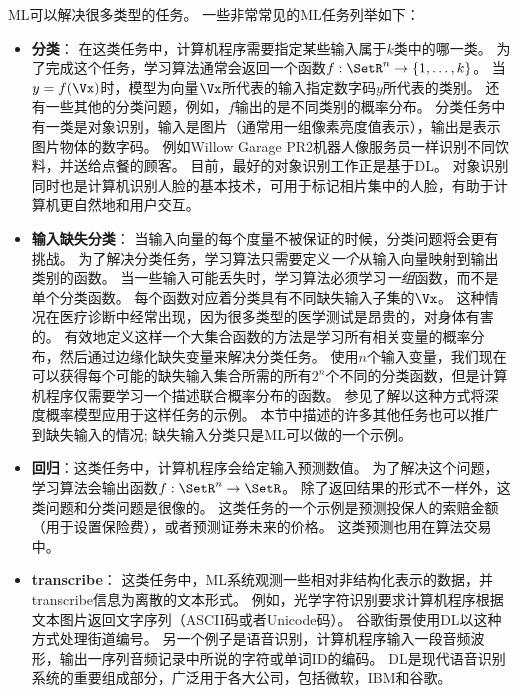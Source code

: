 \gls{ML}可以解决很多类型的任务。
一些非常常见的\gls{ML}任务列举如下：
\begin{itemize}
    \item \textbf{分类}：
    在这类任务中，计算机程序需要指定某些输入属于$k$类中的哪一类。
    为了完成这个任务，学习算法通常会返回一个函数$f:\SetR^n \to \{1,\dots,k\}$。
    当$y=f(\Vx)$时，模型为向量$\Vx$所代表的输入指定数字码$y$所代表的类别。
    还有一些其他的分类问题，例如，$f$输出的是不同类别的概率分布。
    分类任务中有一类是对象识别，输入是图片（通常用一组像素亮度值表示），输出是表示图片物体的数字码。
    例如Willow Garage PR2机器人像服务员一样识别不同饮料，并送给点餐的顾客\citep{Goodfellow2010}。
    目前，最好的对象识别工作正是基于\gls{DL}\citep{Krizhevsky-2012-small,Ioffe+Szegedy-2015}。
    对象识别同时也是计算机识别人脸的基本技术，可用于标记相片集中的人脸\citep{Taigman-et-al-CVPR2014}，有助于计算机更自然地和用户交互。
    
    \item \textbf{输入缺失分类}：
    当输入向量的每个度量不被保证的时候，分类问题将会更有挑战。
    为了解决分类任务，学习算法只需要定义\emph{一个}从输入向量映射到输出类别的函数。
    当一些输入可能丢失时，学习算法必须学习\emph{一组}函数，而不是单个分类函数。
    每个函数对应着分类具有不同缺失输入子集的$\Vx$。
    这种情况在医疗诊断中经常出现，因为很多类型的医学测试是昂贵的，对身体有害的。
    有效地定义这样一个大集合函数的方法是学习所有相关变量的概率分布，然后通过边缘化缺失变量来解决分类任务。 
    使用$n$个输入变量，我们现在可以获得每个可能的缺失输入集合所需的所有$2^n$个不同的分类函数，但是计算机程序仅需要学习一个描述联合概率分布的函数。
    参见\cite{Goodfellow-et-al-NIPS2013}了解以这种方式将深度概率模型应用于这样任务的示例。 
    本节中描述的许多其他任务也可以推广到缺失输入的情况; 缺失输入分类只是\gls{ML}可以做的一个示例。
    

    \item \textbf{回归}：这类任务中，计算机程序会给定输入预测数值。
    为了解决这个问题，学习算法会输出函数$f:\SetR^n \to \SetR$。
    除了返回结果的形式不一样外，这类问题和分类问题是很像的。
    这类任务的一个示例是预测投保人的索赔金额（用于设置保险费），或者预测证券未来的价格。
    这类预测也用在算法交易中。
    
    \item \textbf{\gls{transcribe}}：
    这类任务中，\gls{ML}系统观测一些相对非结构化表示的数据，并\gls{transcribe}信息为离散的文本形式。
    例如，光学字符识别要求计算机程序根据文本图片返回文字序列（ASCII码或者Unicode码）。
    谷歌街景使用\gls{DL}以这种方式处理街道编号\citep{Goodfellow+et+al-ICLR2014a}。
    另一个例子是语音识别，计算机程序输入一段音频波形，输出一序列音频记录中所说的字符或单词ID的编码。
    \gls{DL}是现代语音识别系统的重要组成部分，广泛用于各大公司，包括微软，IBM和谷歌\citep{Hinton-et-al-2012}。


\end{itemize}
